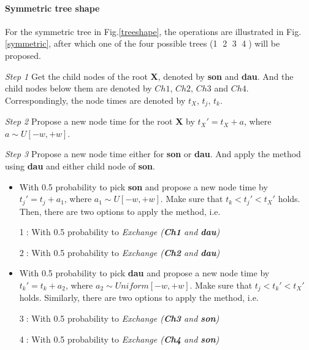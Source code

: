 \documentclass{bmcart}
\begin{document}
\paragraph*{Symmetric tree shape}

For the symmetric tree in Fig.\ref{treeshape}, the operations are illustrated in Fig.\ref{symmetric}, after which one of the four possible trees (\textcircled1 \textcircled2 \textcircled3 \textcircled4) will be proposed.

\emph{Step 1} Get the child nodes of the root \textbf{X}, denoted by \textbf{son} and \textbf{dau}. And the child nodes below them are denoted by $Ch1$, $Ch2$, $Ch3$ and $Ch4$. Correspondingly, the node times are denoted by $t_X$, $t_j$, $t_k$.

\emph{Step 2} Propose a new node time for the root \textbf{X} by ${t_X}' = {t_X} + a$, where $a \sim U[ - w, + w]$.

\emph{Step 3} Propose a new node time either for \textbf{son} or \textbf{dau}. And apply the method using \textbf{dau} and either child node of \textbf{son}.
\begin{itemize}
\item With 0.5 probability to pick \textbf{son} and propose a new node time by ${t_j}' = {t_j} + {a_1}$, where ${a_1} \sim U[ - w, + w]$. Make sure that ${t_k} < {t_j}' < {t_X}'$ holds. Then, there are two options to apply the method, i.e.

\textcircled1: With 0.5 probability to \textit{Exchange (\textbf{Ch1} and \textbf{dau})}

\textcircled2: With 0.5 probability to \textit{Exchange (\textbf{Ch2} and \textbf{dau})}

\item With 0.5 probability to pick \textbf{dau} and propose a new node time by ${t_k}' = {t_k} + {a_2}$, where ${a_2} \sim Uniform[ - w, + w]$. Make sure that ${t_j} < {t_k}' < {t_X}'$ holds. Similarly, there are two options to apply the method, i.e.

\textcircled3: With 0.5 probability to \textit{Exchange (\textbf{Ch3} and \textbf{son})}

\textcircled4: With 0.5 probability to \textit{Exchange (\textbf{Ch4} and \textbf{son})}
\end{itemize}
\end{document}
